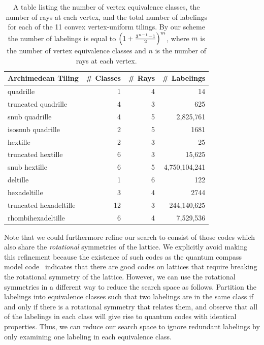 \documentclass[twocolumn,showpacs,preprintnumbers,amsmath,amssymb,nofootinbib,pra,floatfix]{revtex4-1}
\begin{document}
\begin{table}
\begin{tabular}{lrrr} \toprule
Archimedean Tiling & \# Classes & \# Rays & \# Labelings \\ \midrule
quadrille & 1 & 4 & 14\\
truncated quadrille & 4 & 3 & 625\\
snub quadrille & 4 & 5 & 2,825,761\\
isosnub quadrille & 2 & 5 & 1681\\
hextille & 2 & 3 & 25\\
truncated hextille & 6 & 3 & 15,625\\
snub hextille & 6 & 5 & 4,750,104,241\\
deltille & 1 & 6 & 122\\
hexadeltille & 3 & 4 & 2744\\
truncated hexadeltille & 12 & 3 & 244,140,625\\
rhombihexadeltille & 6 & 4 & 7,529,536\\ \bottomrule
\end{tabular}
\caption[Combinatorics of the tilings]{
\label{table:combinatorics}
A table listing the number of vertex equivalence classes, the number of rays at each vertex, and the total number of labelings for each of the 11 convex vertex-uniform tilings.  By our scheme the number of labelings is equal to $\left(1+\frac{3^{n-1}-1}{2}\right)^m$, where $m$ is the number of vertex equivalence classes and $n$ is the number of rays at each vertex.}
\end{table}

Note that we could furthermore refine our search to consist of those codes which also share the \emph{rotational} symmetries of the lattice.  We explicitly avoid making this refinement because the existence of such codes as the quantum compass model code~\cite{Bacon:06a} indicates that there are good codes on lattices that require breaking the rotational symmetry of the lattice.  However, we can use the rotational symmetries in a different way to reduce the search space as follows.  Partition the labelings into equivalence classes such that two labelings are in the same class if and only if there is a rotational symmetry that relates them, and observe that all of the labelings in each class will give rise to quantum codes with identical properties.  Thus, we can reduce our search space to ignore redundant labelings by only examining one labeling in each equivalence class.
\end{document}
